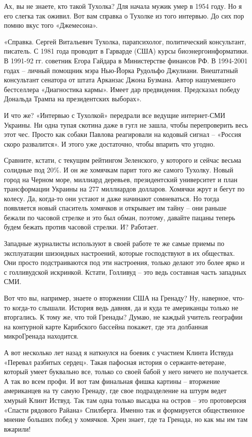 Ах, вы не знаете, кто такой Тухолка? Для начала мужик умер в 1954 году. Но я
его слегка так оживил. Вот вам справка о Тухолке из того интервью. До сих пор
помню вкус того «Джемесона».

«Справка. Сергей Витальевич Тухолка, парапсихолог, политический консультант,
писатель. С 1981 года проводит в Гарварде (США) курсы биоэнергоинформатики. В
1991-92 гг. советник Егора Гайдара в Министерстве финансов РФ. В 1994-2001
годах – личный помощник мэра Нью-Йорка Рудольфо Джулиани. Внештатный
консультант сенатора от штата Арканзас Джона Бузмана. Автор нашумевшего
бестселлера «Диагностика кармы». Имеет дар предвидения. Предсказал победу
Дональда Трампа на президентских выборах».

И что же? «Интервью с Тухолкой» передрали все ведущие интернет-СМИ Украины. Ни
одна тупая скотина даже в гугл не зашла, чтобы перепроверить весь этот чес.
Просто как собаки Павлова реагировали на кодовый сигнал – «Россия скоро
развалится». И этого уже достаточно, чтобы впарить что угодно.

Сравните, кстати, с текущим рейтингом Зеленского, у которого и сейчас весьма
солидные под 20\%. И он же хомячкам парит того же самого Тухолку. Новый город на
Черном море, миллиард деревьев, президентский университет и план трансформации
Украины на 277 миллиардов долларов. Хомячки жрут и бегут по колесу. Да,
когда-то они устают и даже начинают сомневаться. Но тогда появляется новый
спаситель хомячков и открывает им тайну – они раньше бежали по часовой стрелке
и это был обман, поэтому, давайте пацаны теперь будем бежать против часовой
стрелки. И? Работает.

Западные журналисты используют в своей работе те же самые приемы по
эксплуатации шизоидных настроений, которые господствуют в их обществах. Они
просто подстраиваются под эти настроения, только делают это более ярко и с
голливудской искринкой. Кстати, Голливуд – это ведь составная часть западных
СМИ.

Вот что вы, например, знаете о вторжении США на Гренаду? Ну, наверное, что-то
когда-то слышали. История ведь давняя, да и куда те американцы только не
вторгались. К тому же, что той Гренады? Думаю, не каждый учитель географии на
контурной карте Карибского бассейна покажет, где эта долбанная микроГренада
находится.

А вот несколько лет назад я наткнулся на боевик с участием Клинта Иствуда
«Перевал разбитых сердец». Такая пафосная история о сержанте-ветеране, который
умеет буквально все, только со своей бабой у него ничего не получается. А так
во всем профи. И вот там финальная фишка картины – вторжение американцев на ту
самую Гренаду, где свое подразделение на штурм ведет хмурый Клинт Иствуд. Так
там одна только высадка на остров – это протоверсия «Спасти рядового Райана»
Спилберга. Именно так и формируется общественное мнение больших побед у
хомячков. Хрен знает, где та Гренада, но как мы им там вжарили!

